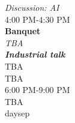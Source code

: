 \begin{calendar}{\textwidth}
{\textit{Discussion: AI}  \\\vspace{0.1cm}4:00 PM-4:30 PM \\\daysep
\textbf{Banquet} \\
\textit{TBA}\\\vspace{0.1cm} \textbf{\textit{Industrial talk}} \\ TBA \\TBA\\\vspace{0.1cm}  6:00 PM-9:00 PM \\ TBA\\daysep
}




\end{calendar}
